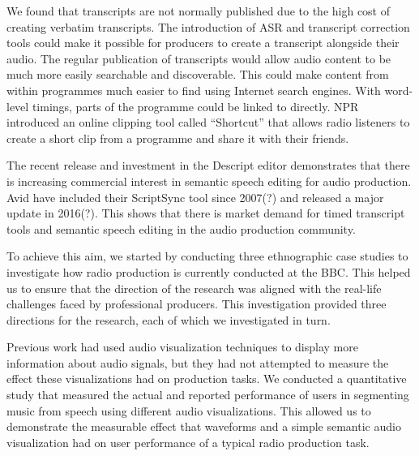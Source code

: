 We found that transcripts are not normally published due to the high cost of creating verbatim transcripts. The
introduction of ASR and transcript correction tools could make it possible for producers to create a transcript
alongside their audio. The regular publication of transcripts would allow audio content to be much more easily
searchable and discoverable. This could make content from within programmes much easier to find using Internet search
engines. With word-level timings, parts of the programme could be linked to directly. NPR introduced an online clipping
tool called ``Shortcut'' \citep{Friedhoff2016} that allows radio listeners to create a short clip from a programme and
share it with their friends. 

The recent release and investment in the Descript editor demonstrates that there is increasing commercial interest in
semantic speech editing for audio production. Avid have included their ScriptSync tool since 2007(?) and released a
major update in 2016(?). This shows that there is market demand for timed transcript tools and semantic speech editing
in the audio production community.











To achieve this aim, we started by conducting three ethnographic case studies to investigate how radio production is
currently conducted at the BBC. This helped us to ensure that the direction of the research was aligned with the
real-life challenges faced by professional producers.  This investigation provided three directions for the research,
each of which we investigated in turn.

Previous work had used audio visualization techniques to display more information about audio signals, but they had not
attempted to measure the effect these visualizations had on production tasks.
We conducted a quantitative study that measured the actual and reported performance of users in segmenting music from
speech using different audio visualizations.
This allowed us to demonstrate the measurable effect that waveforms and a simple semantic audio visualization had on
user performance of a typical radio production task.


